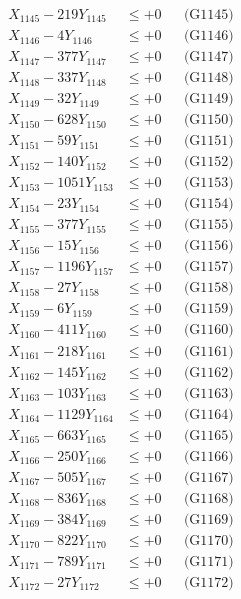 \documentclass[a4paper,10pt]{article}
\begin{document}
{\begin{align}
X_{1145} - 219Y_{1145} &\leq +0 && \text{(G1145)} \\
X_{1146} - 4Y_{1146} &\leq +0 && \text{(G1146)} \\
X_{1147} - 377Y_{1147} &\leq +0 && \text{(G1147)} \\
X_{1148} - 337Y_{1148} &\leq +0 && \text{(G1148)} \\
X_{1149} - 32Y_{1149} &\leq +0 && \text{(G1149)} \\
X_{1150} - 628Y_{1150} &\leq +0 && \text{(G1150)} \\
\allowbreak
X_{1151} - 59Y_{1151} &\leq +0 && \text{(G1151)} \\
X_{1152} - 140Y_{1152} &\leq +0 && \text{(G1152)} \\
X_{1153} - 1051Y_{1153} &\leq +0 && \text{(G1153)} \\
X_{1154} - 23Y_{1154} &\leq +0 && \text{(G1154)} \\
X_{1155} - 377Y_{1155} &\leq +0 && \text{(G1155)} \\
X_{1156} - 15Y_{1156} &\leq +0 && \text{(G1156)} \\
X_{1157} - 1196Y_{1157} &\leq +0 && \text{(G1157)} \\
X_{1158} - 27Y_{1158} &\leq +0 && \text{(G1158)} \\
X_{1159} - 6Y_{1159} &\leq +0 && \text{(G1159)} \\
X_{1160} - 411Y_{1160} &\leq +0 && \text{(G1160)} \\
\allowbreak
X_{1161} - 218Y_{1161} &\leq +0 && \text{(G1161)} \\
X_{1162} - 145Y_{1162} &\leq +0 && \text{(G1162)} \\
X_{1163} - 103Y_{1163} &\leq +0 && \text{(G1163)} \\
X_{1164} - 1129Y_{1164} &\leq +0 && \text{(G1164)} \\
X_{1165} - 663Y_{1165} &\leq +0 && \text{(G1165)} \\
X_{1166} - 250Y_{1166} &\leq +0 && \text{(G1166)} \\
X_{1167} - 505Y_{1167} &\leq +0 && \text{(G1167)} \\
X_{1168} - 836Y_{1168} &\leq +0 && \text{(G1168)} \\
X_{1169} - 384Y_{1169} &\leq +0 && \text{(G1169)} \\
X_{1170} - 822Y_{1170} &\leq +0 && \text{(G1170)} \\
\allowbreak
X_{1171} - 789Y_{1171} &\leq +0 && \text{(G1171)} \\
X_{1172} - 27Y_{1172} &\leq +0 && \text{(G1172)} \\

\end{align}}
\end{document}
